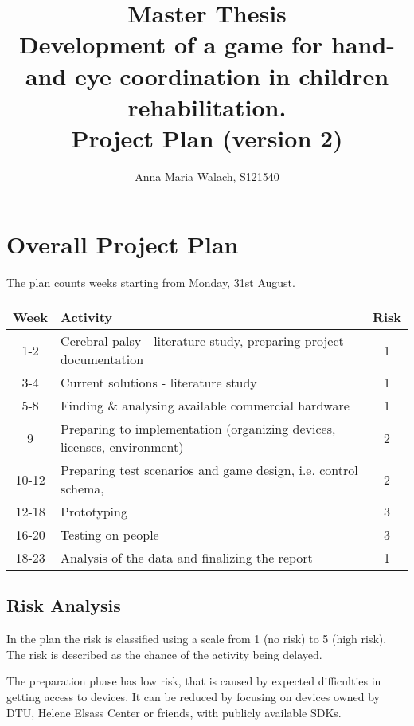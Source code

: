 \documentclass[10pt,a4paper]{article}
\title{{Master Thesis\\[0.5em]}
       {\bf \huge Development of a game for hand- and eye coordination in children rehabilitation.\\[0.5em]}
       {\bf Project Plan (version 2)}}
\author{Anna Maria Walach, S121540}
\begin{document}
\maketitle

\section{Overall Project Plan}

The plan counts weeks starting from Monday, 31st August.

\begin{tabular}{c|l|c}
  Week  & Activity                                            						& Risk
  \\
  \hline
  1-2   & Cerebral palsy - literature study, preparing project documentation     	& 1 \\
  3-4	& Current solutions - literature study	   									& 1 \\
  5-8	& Finding \& analysing available commercial hardware 			 			& 1 \\
   9    & Preparing to implementation (organizing devices, licenses, environment)   & 2 \\
  10-12	& Preparing test scenarios and game design, i.e. control schema,       		& 2 \\
  12-18 & Prototyping									   							& 3 \\
  16-20 & Testing on people														   	& 3 \\
  18-23 & Analysis of the data and finalizing the report     												& 1 \\
  \hline
\end{tabular}
  
\subsection{Risk Analysis}

In the plan the risk is classified using a scale from 1 (no risk) to 5
(high risk). The risk is described as the chance of the activity being
delayed.

The preparation phase has low risk, that is caused by expected difficulties in getting access to devices. It can be reduced by focusing on devices owned by DTU, Helene Elsass Center or friends, with publicly available SDKs. 
\end{document}
